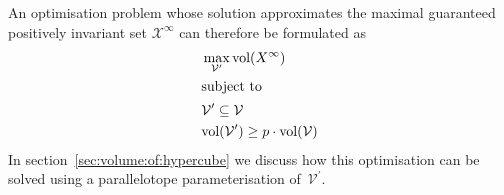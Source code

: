 \documentclass{ifacconf}
\providecommand{\vol}{\text{vol}}
\providecommand{\Xinfty}{{\mathscr X}^\infty}
\providecommand{\V}{\mathcal V}
\begin{document}
An optimisation problem whose solution approximates the maximal guaranteed positively invariant set $\Xinfty$ can therefore be formulated as
%
\begin{subequations}\label{seq:optimisation:MRPI:abstract}
\begin{align}
		& \max_{\V^\prime} \vol(X^\infty) \\
%
\intertext{subject to}
%
	& \V^\prime\subseteq\V \\
	& \vol(\V^\prime)\geq p\cdot\vol(\V)
\end{align}
\end{subequations}
%
In section~\ref{sec:volume:of:hypercube} we discuss how this optimisation can be solved using a parallelotope parameterisation of~$\V^\prime$.
\end{document}
